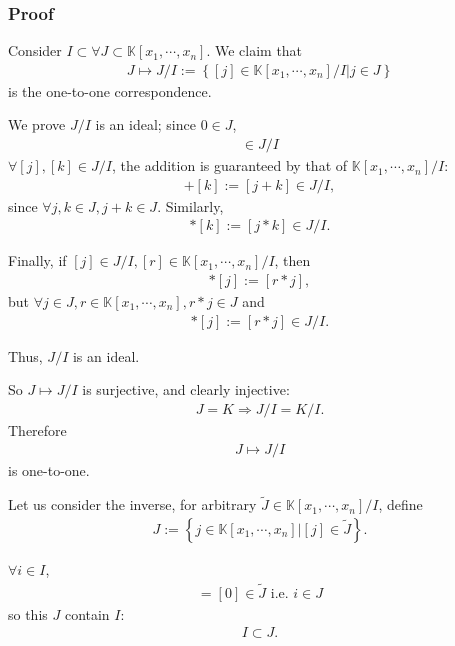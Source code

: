 \documentclass[11pt]{book}
\begin{document}
\subsubsection{Proof}
Consider $I \subset \forall J \subset \mathbb{K}[x_1, \cdots, x_n]$.
We claim that
\begin{eqnarray}
J \mapsto J/I := \left\{ \left. [j] \in \mathbb{K}[x_1, \cdots, x_n] / I \right| j \in J \right\}
\end{eqnarray}
is the one-to-one correspondence.

We prove $J/I$ is an ideal; since $0 \in J$,
\begin{eqnarray}
[0] \in J/I
\end{eqnarray}
$\forall [j],[k] \in J/I$, the addition is guaranteed by that of $\mathbb{K}[x_1, \cdots, x_n] / I$:
\begin{eqnarray}
[j] + [k] := [j+k] \in J/I, 
\end{eqnarray}
since $\forall j,k \in J, j+ k \in J$.
Similarly,
\begin{eqnarray}
[j] * [k] := [j*k] \in J/I.
\end{eqnarray}

Finally, if $[j] \in J/I, [r] \in \mathbb{K}[x_1, \cdots, x_n] / I$, then
\begin{eqnarray}
[r] * [j] := [r*j],
\end{eqnarray}
but $\forall j \in J, r \in \mathbb{K}[x_1, \cdots, x_n], r*j \in J$ and
\begin{eqnarray}
[r] * [j] := [r*j] \in J/I.
\end{eqnarray}

Thus, $J/I$ is an ideal.

So $J \mapsto J/I$ is surjective, and clearly injective:
\begin{eqnarray}
J = K \Rightarrow J/I = K/I.
\end{eqnarray}
Therefore
\begin{eqnarray}
J \mapsto J/I
\end{eqnarray}
is one-to-one.

Let us consider the inverse, for arbitrary $\tilde{J} \in \mathbb{K}[x_1, \cdots, x_n] / I$, define
\begin{eqnarray}
J := \left\{ \left. j \in \mathbb{K}[x_1, \cdots, x_n] \right| [j] \in \tilde{J} \right\}.
\end{eqnarray}

$\forall i \in I$,
\begin{eqnarray}
[i] = [0] \in \tilde{J} \text{ i.e. } i \in J
\end{eqnarray}
so this $J$ contain $I$:
\begin{eqnarray}
I \subset J.
\end{eqnarray}
\end{document}
